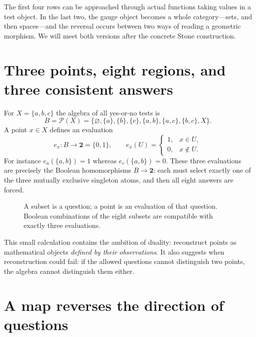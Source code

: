 The first four rows can be approached through actual functions taking values in a test object. In the last two, the gauge object becomes a whole category---sets, and then spaces---and the reversal occurs between two ways of reading a geometric morphism. We will meet both versions after the concrete Stone construction.

\section{Three points, eight regions, and three consistent answers}

For $X=\{a,b,c\}$ the algebra of all yes-or-no tests is
\[
 B=\mathcal P(X)
 =\{\varnothing,\{a\},\{b\},\{c\},
       \{a,b\},\{a,c\},\{b,c\},X\}.
\]
A point $x\in X$ defines an evaluation
\[
 e_x:B\longrightarrow\mathbf2=\{0,1\},
 \qquad e_x(U)=
 \begin{cases}1,&x\in U,\\0,&x\notin U.\end{cases}
\]
For instance $e_a(\{a,b\})=1$ whereas $e_c(\{a,b\})=0$. These three evaluations are precisely the Boolean homomorphisms $B\to\mathbf2$: each must select exactly one of the three mutually exclusive singleton atoms, and then all eight answers are forced.

\begin{figure}[H]
\centering
{}
\caption{A subset is a question; a point is an evaluation of that question. Boolean combinations of the eight subsets are compatible with exactly three evaluations.}
\end{figure}

This small calculation contains the ambition of duality: reconstruct points as mathematical objects \emph{defined by their observations}. It also suggests when reconstruction could fail: if the allowed questions cannot distinguish two points, the algebra cannot distinguish them either.


\section{A map reverses the direction of questions}

